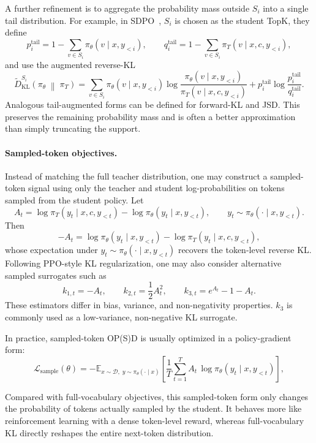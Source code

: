 A further refinement is to aggregate the probability mass outside \(S_i\) into
a single tail distribution. For example, in SDPO~\cite{hubotter2026reinforcementlearningselfdistillation},
\(S_i\) is chosen as the student TopK, they define
\[
p_i^{\mathrm{tail}}
=
1-\sum_{v\in S_i}\pi_\theta(v\mid x,y_{<i}),
\qquad
q_i^{\mathrm{tail}}
=
1-\sum_{v\in S_i}\pi_T(v\mid x,c,y_{<i}),
\]
and use the augmented reverse-KL
\[
\widetilde D_{\mathrm{KL}}^{S_i}\!\left(
\pi_\theta
\;\middle\|\;
\pi_T
\right)
=
\sum_{v\in S_i}
\pi_\theta(v\mid x,y_{<i})
\log
\frac{
\pi_\theta(v\mid x,y_{<i})
}{
\pi_T(v\mid x,c,y_{<i})
}
+
p_i^{\mathrm{tail}}
\log
\frac{
p_i^{\mathrm{tail}}
}{
q_i^{\mathrm{tail}}
}.
\]
Analogous tail-augmented forms can be defined for forward-KL and JSD. This
preserves the remaining probability mass and is often a better approximation
than simply truncating the support.


\paragraph{Sampled-token objectives.}
\label{subsubsection:sampled_token_loss}

Instead of matching the full teacher distribution, one may construct a sampled-token signal using only the teacher and student log-probabilities on tokens sampled from the student policy. Let
\[
A_t
=
\log \pi_T(y_t\mid x,c,y_{<t})
-
\log \pi_\theta(y_t\mid x,y_{<t}),
\qquad
y_t \sim \pi_\theta(\cdot \mid x,y_{<t}).
\]
Then
\[
-A_t
=
\log \pi_\theta(y_t\mid x,y_{<t})
-
\log \pi_T(y_t\mid x,c,y_{<t}),
\]
whose expectation under \(y_t \sim \pi_\theta(\cdot\mid x,y_{<t})\) recovers the token-level reverse KL. Following PPO-style KL regularization, one may also consider alternative sampled surrogates such as
\[
k_{1,t} = -A_t,
\qquad
k_{2,t} = \frac{1}{2}A_t^2,
\qquad
k_{3,t} = e^{A_t} - 1 - A_t.
\]
These estimators differ in bias, variance, and non-negativity properties. \(k_3\) is commonly used as a low-variance, non-negative KL surrogate.

In practice, sampled-token OP(S)D is usually optimized in a policy-gradient form:
\[
\mathcal{L}_{\mathrm{sample}}(\theta)
=
-
\mathbb{E}_{x\sim\mathcal D,\; y\sim\pi_\theta(\cdot\mid x)}
\left[
\frac{1}{T}\sum_{t=1}^T
A_t\,
\log \pi_\theta(y_t\mid x,y_{<t})
\right],
\]

Compared with full-vocabulary objectives, this sampled-token form only changes
the probability of tokens actually sampled by the student. It behaves
more like reinforcement learning with a dense token-level reward, whereas
full-vocabulary KL directly reshapes the entire next-token distribution.


